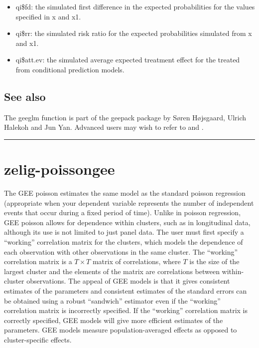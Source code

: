 \documentclass[letterpaper,10pt,english]{sphinxmanual}
\begin{document}
\begin{itemize}
\begin{itemize}
\item {} 
qi\$fd: the simulated first difference in the expected
probabilities for the values specified in x and x1.

\item {} 
qi\$rr: the simulated risk ratio for the expected probabilities
simulated from x and x1.

\item {} 
qi\$att.ev: the simulated average expected treatment effect for the
treated from conditional prediction models.

\end{itemize}

\end{itemize}


\subsection{See also}
\label{vignette:id131}
The geeglm function is part of the geepack package by Søren Højsgaard,
Ulrich Halekoh and Jun Yan. Advanced users may wish to refer
to  and .


\bigskip\hrule{}\bigskip



\section{zelig-poissongee}
\label{vignette:zelig-poissongee}\label{vignette:zpoissongee}
The GEE poisson estimates the same model as the standard poisson
regression (appropriate when your dependent variable represents the
number of independent events that occur during a fixed period of time).
Unlike in poisson regression, GEE poisson allows for dependence within
clusters, such as in longitudinal data, although its use is not limited
to just panel data. The user must first specify a “working” correlation
matrix for the clusters, which models the dependence of each observation
with other observations in the same cluster. The “working” correlation
matrix is a \(T \times T\) matrix of correlations, where \(T\)
is the size of the largest cluster and the elements of the matrix are
correlations between within-cluster observations. The appeal of GEE
models is that it gives consistent estimates of the parameters and
consistent estimates of the standard errors can be obtained using a
robust “sandwich” estimator even if the “working” correlation matrix is
incorrectly specified. If the “working” correlation matrix is correctly
specified, GEE models will give more efficient estimates of the
parameters. GEE models measure population-averaged effects as opposed to
cluster-specific effects.
\end{document}
